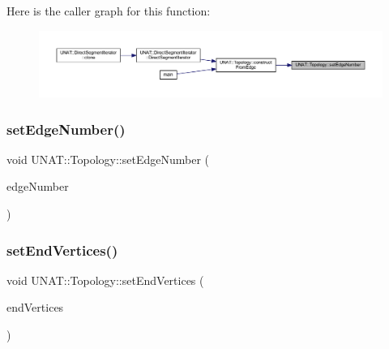 Here is the caller graph for this function\+:
\nopagebreak
\begin{figure}[H]
\begin{center}
\leavevmode
\includegraphics[width=350pt]{classUNAT_1_1Topology_aaf9838827f3d81110b6911a23fc28864_icgraph}
\end{center}
\end{figure}
\mbox{\label{classUNAT_1_1Topology_aaf9838827f3d81110b6911a23fc28864}} 
\subsubsection{\texorpdfstring{setEdgeNumber()}{setEdgeNumber()}\hspace{0.1cm}{\footnotesize\ttfamily [3/3]}}
{\footnotesize\ttfamily void U\+N\+A\+T\+::\+Topology\+::set\+Edge\+Number (\begin{DoxyParamCaption}\item[{\mbox{\hyperlink{include_2swMacro_8h_a113cf5f6b5377cdf3fac6aa4e443e9aa}{sw\+Int}}}]{edge\+Number }\end{DoxyParamCaption})\hspace{0.3cm}{\ttfamily [inline]}}

\mbox{\label{classUNAT_1_1Topology_a238cee750b0467fe8d479b88f4cd2399}} 
\subsubsection{\texorpdfstring{setEndVertices()}{setEndVertices()}\hspace{0.1cm}{\footnotesize\ttfamily [1/3]}}
{\footnotesize\ttfamily void U\+N\+A\+T\+::\+Topology\+::set\+End\+Vertices (\begin{DoxyParamCaption}\item[{\mbox{\hyperlink{include_2swMacro_8h_a113cf5f6b5377cdf3fac6aa4e443e9aa}{sw\+Int}} $\ast$}]{end\+Vertices }\end{DoxyParamCaption})\hspace{0.3cm}{\ttfamily [inline]}}

